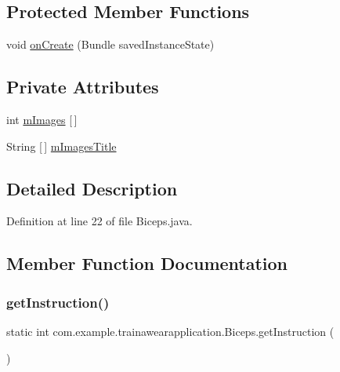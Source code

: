 \subsection*{Protected Member Functions}
\begin{DoxyCompactItemize}
\item 
void \mbox{\hyperlink{classcom_1_1example_1_1trainawearapplication_1_1_biceps_abcdfd60742e9da12033fad625275ca4f}{on\+Create}} (Bundle saved\+Instance\+State)
\end{DoxyCompactItemize}
\subsection*{Private Attributes}
\begin{DoxyCompactItemize}
\item 
int \mbox{\hyperlink{classcom_1_1example_1_1trainawearapplication_1_1_biceps_a48759c12a8068afab742cfdafa76772a}{m\+Images}} \mbox{[}$\,$\mbox{]}
\item 
String \mbox{[}$\,$\mbox{]} \mbox{\hyperlink{classcom_1_1example_1_1trainawearapplication_1_1_biceps_acc5fba9ec43f042ed263e515defce14e}{m\+Images\+Title}}
\end{DoxyCompactItemize}


\subsection{Detailed Description}


Definition at line 22 of file Biceps.\+java.



\subsection{Member Function Documentation}
\mbox{\label{classcom_1_1example_1_1trainawearapplication_1_1_biceps_ae96aa9493d3419ad5d9690b146926e53}} 
\subsubsection{\texorpdfstring{getInstruction()}{getInstruction()}}
{\footnotesize\ttfamily static int com.\+example.\+trainawearapplication.\+Biceps.\+get\+Instruction (\begin{DoxyParamCaption}{ }\end{DoxyParamCaption})\hspace{0.3cm}{\ttfamily [static]}}



